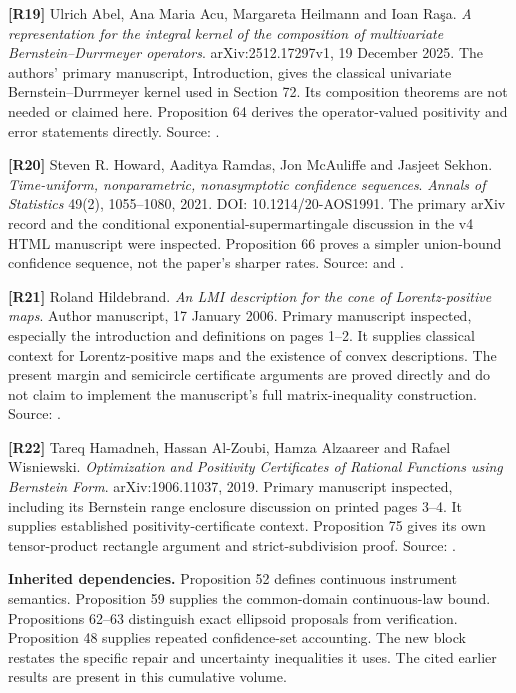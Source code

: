 \documentclass[11pt,letterpaper]{article}
\begin{document}
\textbf{{[}R19{]}} Ulrich Abel, Ana Maria Acu, Margareta Heilmann and
Ioan Raşa. \emph{A representation for the integral kernel of the
composition of multivariate Bernstein--Durrmeyer operators}.
arXiv:2512.17297v1, 19 December 2025. The authors' primary manuscript,
Introduction, gives the classical univariate Bernstein--Durrmeyer kernel
used in Section 72. Its composition theorems are not needed or claimed
here. Proposition 64 derives the operator-valued positivity and error
statements directly. Source:
.

\textbf{{[}R20{]}} Steven R. Howard, Aaditya Ramdas, Jon McAuliffe and
Jasjeet Sekhon. \emph{Time-uniform, nonparametric, nonasymptotic
confidence sequences}. \emph{Annals of Statistics} 49(2), 1055--1080,
2021. DOI: 10.1214/20-AOS1991. The primary arXiv record and the
conditional exponential-supermartingale discussion in the v4 HTML
manuscript were inspected. Proposition 66 proves a simpler union-bound
confidence sequence, not the paper's sharper rates. Source:
 and
.

\textbf{{[}R21{]}} Roland Hildebrand. \emph{An LMI description for the
cone of Lorentz-positive maps}. Author manuscript, 17 January 2006.
Primary manuscript inspected, especially the introduction and
definitions on pages 1--2. It supplies classical context for
Lorentz-positive maps and the existence of convex descriptions. The
present margin and semicircle certificate arguments are proved directly
and do not claim to implement the manuscript's full matrix-inequality
construction. Source:
.

\textbf{{[}R22{]}} Tareq Hamadneh, Hassan Al-Zoubi, Hamza Alzaareer and
Rafael Wisniewski. \emph{Optimization and Positivity Certificates of
Rational Functions using Bernstein Form}. arXiv:1906.11037, 2019.
Primary manuscript inspected, including its Bernstein range enclosure
discussion on printed pages 3--4. It supplies established
positivity-certificate context. Proposition 75 gives its own
tensor-product rectangle argument and strict-subdivision proof. Source:
.

\textbf{Inherited dependencies.} Proposition 52 defines continuous
instrument semantics. Proposition 59 supplies the common-domain
continuous-law bound. Propositions 62--63 distinguish exact ellipsoid
proposals from verification. Proposition 48 supplies repeated
confidence-set accounting. The new block restates the specific repair
and uncertainty inequalities it uses. The cited earlier results are
present in this cumulative volume.
\end{document}
